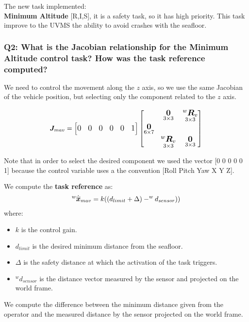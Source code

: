 \documentclass{article}
\begin{document}
\noindent
\vspace{5px}
The new task implemented: \\
\textbf{Minimum Altitude} [R,I,S], it is a safety task, so it has high priority. This task improve to the UVMS the ability to avoid crashes with the seafloor.

\subsubsection{Q2: What is the Jacobian relationship for the Minimum Altitude control task? How was the task reference computed?}
We need to control the movement along the $z$ axis, so we use the same Jacobian of the vehicle position, but selecting only the component related to the $z$ axis.

\begin{equation}
\large
\boldsymbol{J}_{mav}=\begin{bmatrix} 0 & 0 & 0 & 0 & 0 & 1
\end{bmatrix}
    \begin{bmatrix}
     & \underset{3\times 3}{\boldsymbol{0}} & \underset{ 3\times 3}{^{w}\boldsymbol{R}_{v}} \\
     \underset{ 6\times 7}{\boldsymbol{0}} \\
     & \underset{ 3\times 3}{^{w}\boldsymbol{R}_{v}} & \underset{3\times 3}{\boldsymbol{0}} \\
    \end{bmatrix}
\end{equation}

Note that in order to select the desired component we used the vector [0 0 0 0 0 1] because the control variable uses a the convention [Roll Pitch Yaw X Y Z].

\noindent
\vspace{5px}
We compute the \textbf{task reference} as: 
\begin{equation}
\large
    ^{w}\dot{\overline{\boldsymbol{x}}}_{mav} = k((d_{limit}+\Delta)- ^w d_{sensor})) %
\end{equation}
where:
\begin{itemize}
    \item $k$ is the control gain.
    \item $d_{limit}$ is the desired minimum distance from the seafloor.
    \item $ \Delta $ is the safety distance at which the activation of the task triggers.
    \item $^w d_{sensor}$ is the distance vector measured by the sensor and projected on the world frame.
\end{itemize} 
We compute the difference between the minimum distance given from the operator and the measured distance by the sensor projected on the world frame.
\end{document}
